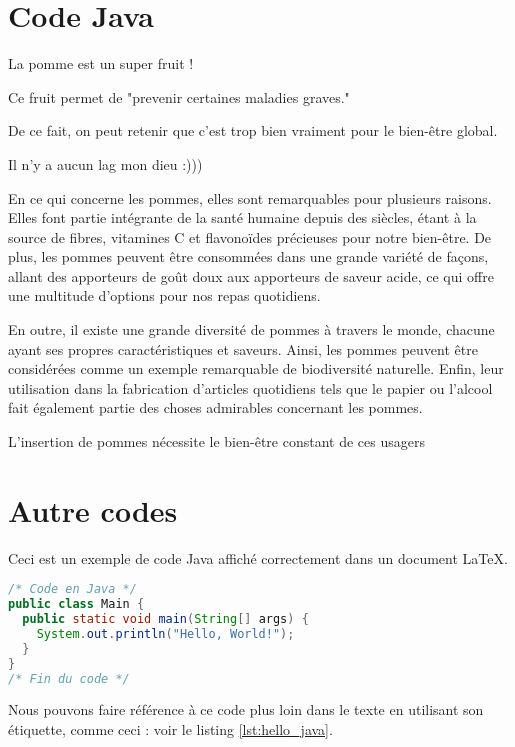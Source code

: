 \documentclass{article}
\begin{document}
\section{Code Java}

La pomme est un super fruit !

Ce fruit permet de "prevenir certaines maladies graves."



De ce fait, on peut retenir que c'est trop bien vraiment pour le bien-être global.


Il n'y a aucun lag mon dieu :)))

 En ce qui concerne les pommes, elles sont remarquables pour plusieurs raisons. Elles font partie intégrante de la santé humaine depuis des siècles, étant à la source de fibres, vitamines C et flavonoïdes précieuses pour notre bien-être. De plus, les pommes peuvent être consommées dans une grande variété de façons, allant des apporteurs de goût doux aux apporteurs de saveur acide, ce qui offre une multitude d'options pour nos repas quotidiens.

En outre, il existe une grande diversité de pommes à travers le monde, chacune ayant ses propres caractéristiques et saveurs. Ainsi, les pommes peuvent être considérées comme un exemple remarquable de biodiversité naturelle. Enfin, leur utilisation dans la fabrication d'articles quotidiens tels que le papier ou l'alcool fait également partie des choses admirables concernant les pommes.

L'insertion de pommes nécessite le bien-être constant de ces usagers



\section{Autre codes}

Ceci est un exemple de code Java affiché correctement dans un document LaTeX.

\begin{lstlisting}[language=Java, caption={Exemple "Hello, World!" en Java.}, label={lst:hello_java}]
/* Code en Java */
public class Main {
  public static void main(String[] args) {
    System.out.println("Hello, World!");
  }
}
/* Fin du code */
\end{lstlisting}

Nous pouvons faire référence à ce code plus loin dans le texte en utilisant son étiquette, comme ceci : voir le listing \ref{lst:hello_java}.
\end{document}
